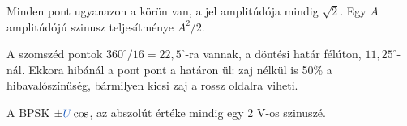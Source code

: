 Minden pont ugyanazon a körön van, a jel amplitúdója mindig $\sqrt2$. Egy $A$ amplitúdójú szinusz teljesítménye $A^2/2$.

\begin{center}\end{center}

A szomszéd pontok $360^{\circ}/16=22{,}5^{\circ}$-ra vannak, a döntési határ félúton, $11{,}25^{\circ}$-nál. Ekkora hibánál a pont pont a határon ül: zaj nélkül is 50\% a hibavalószínűség, bármilyen kicsi zaj a rossz oldalra viheti.

\begin{center}\end{center}

A BPSK $\pm {\ca{U}}\cos$, az abszolút értéke mindig egy 2 V-os szinuszé.

\begin{center}\end{center}

